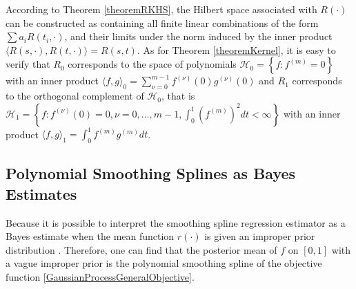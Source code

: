 According to Theorem \ref{theoremRKHS}, the Hilbert space associated with $R(\cdot)$ can be constructed as containing all finite linear combinations of the form $\sum a_iR(t_i,\cdot)$, and their limits under the norm induced by the inner product $\langle R(s,\cdot),R(t,\cdot) \rangle = R(s,t)$. As for Theorem \ref{theoremKernel}, it is easy to verify that $R_0$ corresponds to the space of polynomials $\mathcal{H}_0 =\left\lbrace f:f^{(m)}=0\right\rbrace$ with an inner product $\langle f, g \rangle_0 = \sum_{\nu=0}^{m-1} f^{(\nu)}(0)g^{(\nu)}(0)$ and $R_1$ corresponds to the orthogonal complement of $\mathcal{H}_0$, that is $\mathcal{H}_1 =\left\lbrace   f:f^{(\nu)}(0)=0,\nu = 0, \ldots,m-1, \int_{0}^{1}(f^{(m)})^2dt <\infty  \right\rbrace$ with an inner product $\langle f, g\rangle_1 = \int_{0}^{1}f^{(m)}g^{(m)}dt $. 



\subsection{Polynomial Smoothing Splines as Bayes Estimates}

Because it is possible to interpret the smoothing spline regression estimator as a Bayes estimate when the mean function $r(\cdot)$ is given an improper prior distribution \citep{wahba1990spline, berlinet2011reproducing}. Therefore, one can find that the posterior mean of $f$ on $[0,1]$ with a vague improper prior is the polynomial smoothing spline of the objective function  \eqref{GaussianProcessGeneralObjective}. 

